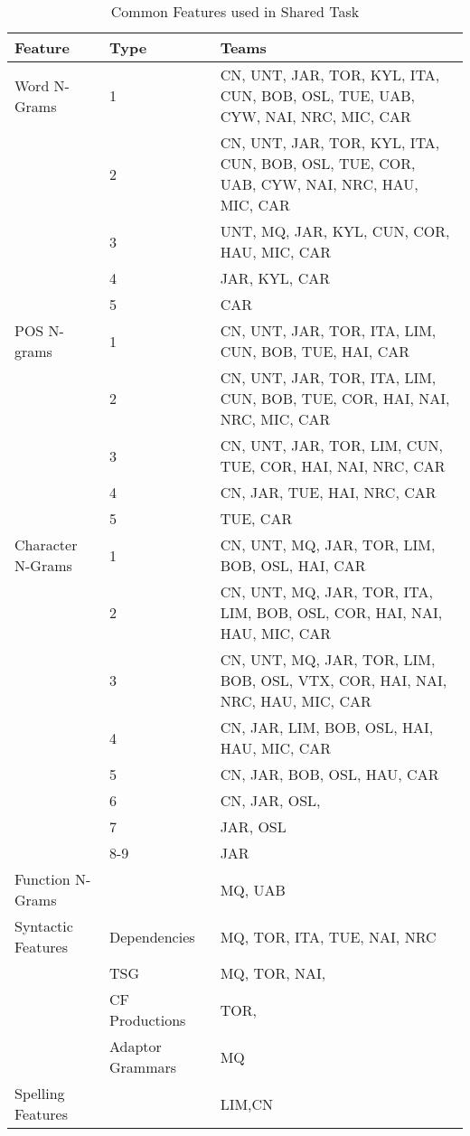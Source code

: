 \documentclass[11pt,letterpaper]{article}
\begin{document}
\begin{table*}[htbp]
\begin{small}
\begin{tabular}{|l|l|p{9.5cm}|}
\hline
{\bf Feature} & {\bf Type} & {\bf Teams} \\  \hline
Word N-Grams       & 1      & CN, UNT, JAR, TOR, KYL, ITA, CUN, BOB, OSL, TUE, UAB, CYW, NAI, NRC, MIC, CAR   \\ \hline
		   & 2      & CN, UNT, JAR, TOR, KYL, ITA, CUN, BOB, OSL, TUE, COR, UAB, CYW, NAI, NRC, HAU, MIC, CAR \\ \hline
                   & 3      & UNT, MQ, JAR, KYL, CUN, COR, HAU, MIC, CAR  \\ \hline
                   & 4      & JAR, KYL, CAR   \\ \hline
		   & 5      & CAR \\ \hline
POS N-grams        & 1      & CN, UNT, JAR, TOR, ITA, LIM, CUN, BOB, TUE, HAI, CAR  \\ \hline
		   & 2      & CN, UNT, JAR, TOR, ITA, LIM, CUN, BOB, TUE, COR, HAI, NAI, NRC, MIC, CAR   \\ \hline
                   & 3      & CN, UNT, JAR, TOR, LIM, CUN, TUE, COR, HAI, NAI, NRC, CAR     \\ \hline
                   & 4      & CN, JAR, TUE, HAI, NRC, CAR    \\ \hline
                   & 5      & TUE, CAR \\ \hline
Character N-Grams  & 1      & CN, UNT, MQ, JAR, TOR, LIM, BOB, OSL, HAI, CAR  \\ \hline
                   & 2      & CN, UNT, MQ, JAR, TOR, ITA, LIM, BOB, OSL, COR, HAI, NAI, HAU, MIC, CAR  \\ \hline
                   & 3      & CN, UNT, MQ, JAR, TOR, LIM, BOB, OSL, VTX, COR, HAI, NAI, NRC, HAU, MIC, CAR \\ \hline
                   & 4      & CN, JAR, LIM, BOB, OSL, HAI, HAU, MIC, CAR \\ \hline
                   & 5      & CN, JAR, BOB, OSL, HAU, CAR  \\ \hline
                   & 6      & CN, JAR, OSL,   \\ \hline
	           & 7      & JAR, OSL \\ \hline
                   & 8-9    & JAR \\ \hline
Function N-Grams   &        & MQ, UAB  \\ \hline
Syntactic Features & Dependencies        & MQ, TOR, ITA, TUE, NAI, NRC \\ \hline
                   & TSG                 & MQ, TOR, NAI,  \\ \hline
                   & CF Productions      & TOR, \\ \hline
		   & Adaptor Grammars  & MQ  \\ \hline
Spelling Features  &        &   LIM,CN  \\ \hline
\end{tabular}
\end{small}
\caption{Common Features used in Shared Task\label{tab:common-features}}
\end{table*}
\end{document}
